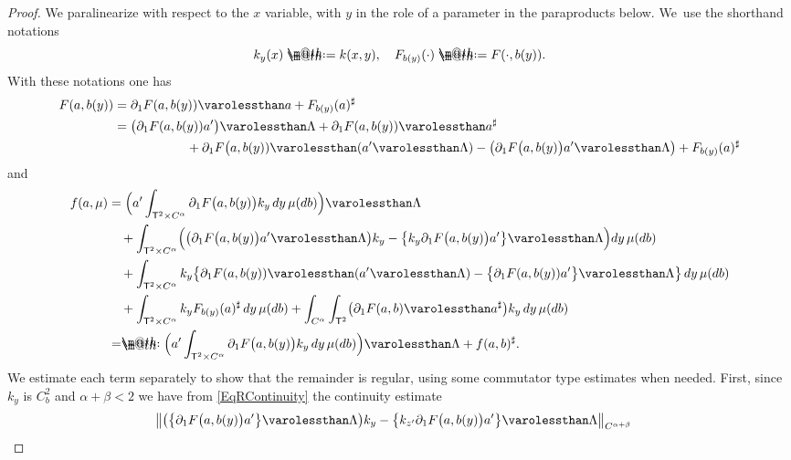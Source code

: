 \documentclass[JEP,XML,SOM,Unicode,published]{cedram}
\makeatletter
\theoremstyle{definition}
\newcommand*{\defeq}{\mathrel{\rlap{%
\raisebox{0.3ex}{$\m@th\cdot$}}%
\raisebox{-0.3ex}{$\m@th\cdot$}}%
=}
\newcommand*{\eqdef}{=\mathrel{\rlap{%
\raisebox{0.3ex}{$\m@th\cdot$}}%
\raisebox{-0.3ex}{$\m@th\cdot$}}%
}
\makeatother
\begin{document}
\begin{proof}
We paralinearize with respect to the $x$ variable, with $y$ in the role of a parameter in the paraproducts below. We~use the shorthand notations
\[
k_y(x) \defeq k(x, y), \quad F_{b(y)}(\cdot) \defeq F(\cdot,b(y)).
\]
With these notations one has
\begin{equation*} \begin{split}
F(a, b(y)) &= \partial_1F(a, b(y)) \varolessthan a + F_{b(y)}(a)^\sharp \\
&= \bigl(\partial_1F(a, b(y)) a'\bigr) \varolessthan \Lambda + \partial_1F(a, b(y)) \varolessthan a^\sharp \\
&\hspace*{2cm}+ \partial_1F\bigl(a, b(y)) \varolessthan (a' \varolessthan \Lambda) - \bigl( \partial_1F\bigl(a, b(y)\bigr) a' \varolessthan \Lambda \bigr) + F_{b(y)}(a)^\sharp
\end{split} \end{equation*}
and
\begin{align*}
f(a, \mu) &= \Bigl( a' \int_{\mathsf{T}^2 \times C^\alpha} \partial_1F\bigl(a, b(y)\bigr) k_y \, dy \,\mu(db) \Bigr) \varolessthan \Lambda
\\
&\quad+ \int_{\mathsf{T}^2 \times C^\alpha} \Bigl(\bigl( \partial_1 F\bigl(a, b(y)\bigr) a' \varolessthan \Lambda\bigr) k_y - \bigl\{ k_y\partial_1 F\bigl(a, b(y)\bigr) a'\bigr\} \varolessthan \Lambda \Bigr) dy\,\mu(db) \\
&\quad+ \int_{\mathsf{T}^2 \times C^\alpha} k_y \bigl\{ \partial_1F(a, b(y)) \varolessthan (a' \varolessthan \Lambda) - \bigl\{\partial_1F(a, b(y)) a'\bigr\} \varolessthan \Lambda \bigr\} \, dy \,\mu(db)
\\
&\quad+ \int_{\mathsf{T}^2 \times C^\alpha} k_y F_{b(y)}(a)^\sharp \, dy \, \mu(db) + \int_{C^\alpha}\int_{\mathsf{T}^2} \bigl(\partial_1 F(a, b) \varolessthan a^\sharp \bigr) k_y \, dy \,\mu(db)
\\
&\eqdef \Bigl( a' \int_{\mathsf{T}^2 \times C^\alpha} \partial_1F\bigl(a, b(y)\bigr) k_y \, dy \, \mu(db)\Bigr) \varolessthan \Lambda + f(a,b)^\sharp.
\end{align*}
We estimate each term separately to show that the remainder is regular, using some commutator type estimates when needed. First, since $k_y$ is $C^2_b$ and $\alpha+\beta<2$ we have from \eqref{EqRContinuity} the continuity estimate
\begin{equation*} \begin{split}
\big\Vert \bigl( \bigl\{\partial_1 F\bigl(a, b(y)\bigr) a' \bigr\} \varolessthan \Lambda \bigr) k_y - \bigl\{ k_{z'}\partial_1 &F\bigl(a, b(y)\bigr) a'\bigr\} \varolessthan \Lambda \big\Vert_{C^{\alpha+\beta}}

\end{split}
\end{equation*}
\end{proof}
\end{document}
